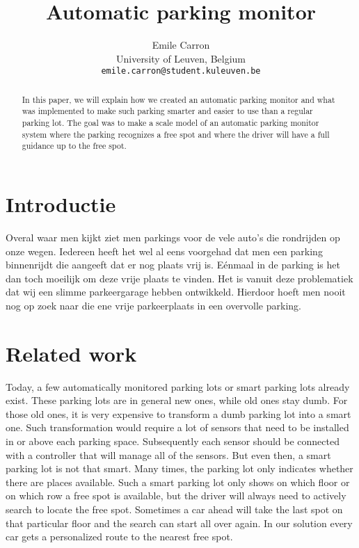 \documentclass[10pt,twocolumn]{article}
\begin{document}
\title{Automatic parking monitor}

\author{Emile Carron\\
University of Leuven, Belgium\\
{\tt\small emile.carron@student.kuleuven.be}
}


\maketitle
\ificcvfinal\thispagestyle{empty}\fi

\begin{abstract}
In this paper, we will explain how we created an automatic parking monitor and what was implemented to make such parking smarter and easier to use than a regular parking lot. The goal was to make a scale model of an automatic parking monitor system where the parking recognizes a free spot and where the driver will have a full guidance up to the free spot.
\end{abstract}

\section{Introductie}

Overal waar men kijkt ziet men parkings voor de vele auto’s die rondrijden op  onze wegen. Iedereen heeft het wel al eens voorgehad dat men een parking binnenrijdt die aangeeft dat er nog plaats vrij is. Eénmaal in de parking is het dan toch moeilijk om deze vrije plaats te vinden. Het is vanuit deze problematiek dat wij een slimme parkeergarage hebben ontwikkeld. Hierdoor hoeft men nooit nog op zoek naar die ene vrije parkeerplaats in een overvolle parking.


\section{Related work}

Today, a few automatically monitored parking lots or smart parking lots already exist. These parking lots are in general new ones, while old ones stay dumb. For those old ones, it is very expensive to transform a dumb parking lot into a smart one. Such transformation would require a lot of sensors that need to be installed in or above each parking space. Subsequently each sensor should be connected with a controller that will manage all of the sensors. But even then, a smart parking lot is not that smart. Many times, the parking lot only indicates whether there are places available. Such a smart parking lot only shows on which floor or on which row a free spot is available, but the driver will always need to actively search to locate the free spot. Sometimes a car ahead will take the last spot on that particular floor and the search can start all over again. In our solution every car gets a personalized route to the nearest free spot.
\end{document}
